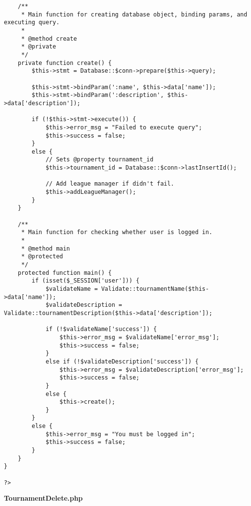 {\begin{lstlisting}
	/**
	 * Main function for creating database object, binding params, and executing query.
	 *
	 * @method create
	 * @private
	 */
	private function create() {
		$this->stmt = Database::$conn->prepare($this->query);

		$this->stmt->bindParam(':name', $this->data['name']);
		$this->stmt->bindParam(':description', $this->data['description']);

		if (!$this->stmt->execute()) {
			$this->error_msg = "Failed to execute query";
			$this->success = false;
		}
		else {
			// Sets @property tournament_id
			$this->tournament_id = Database::$conn->lastInsertId();

			// Add league manager if didn't fail.
			$this->addLeagueManager();
		}
	}

	/**
	 * Main function for checking whether user is logged in.
	 *
	 * @method main
	 * @protected
	 */
	protected function main() {
		if (isset($_SESSION['user'])) {
			$validateName = Validate::tournamentName($this->data['name']);
			$validateDescription = Validate::tournamentDescription($this->data['description']);

			if (!$validateName['success']) {
				$this->error_msg = $validateName['error_msg'];
				$this->success = false;
			}
			else if (!$validateDescription['success']) {
				$this->error_msg = $validateDescription['error_msg'];
				$this->success = false;
			}
			else {
				$this->create();
			}
		}
		else {
			$this->error_msg = "You must be logged in";
			$this->success = false;
		}
	}
}

?>\end{lstlisting}
}
\textbf{TournamentDelete.php}

